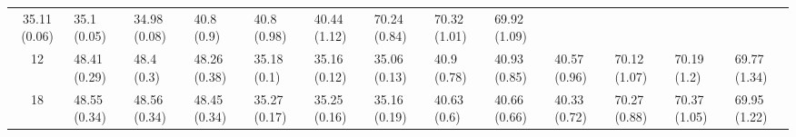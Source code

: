 \documentclass[letterpaper]{article} %
\newcommand{\hh}[1]{\textcolor{green}{#1}}
\begin{document}
{\begin{table}[]
\begin{center}
{\begin{tabular}{c|llllll|llllll}
  35.11 (0.06) &
  35.1 (0.05) &
  34.98 (0.08) &
  40.8 (0.9) &
  40.8 (0.98) &
  \multicolumn{1}{l|}{40.44 (1.12)} &
  70.24 (0.84) &
  70.32 (1.01) &
  69.92 (1.09) \\
12 &
  48.41 (0.29) &
  48.4 (0.3) &
  \multicolumn{1}{l|}{48.26 (0.38)} &
  35.18 (0.1) &
  35.16 (0.12) &
  35.06 (0.13) &
  40.9 (0.78) &
  40.93 (0.85) &
  \multicolumn{1}{l|}{40.57 (0.96)} &
  70.12 (1.07) &
  70.19 (1.2) &
  69.77 (1.34) \\
18 &
  48.55 (0.34) &
  48.56 (0.34) &
  \multicolumn{1}{l|}{48.45 (0.34)} &
  35.27 (0.17) &
  35.25 (0.16) &
  35.16 (0.19) &
  40.63 (0.6) &
  40.66 (0.66) &
  \multicolumn{1}{l|}{40.33 (0.72)} &
  70.27 (0.88) &
  70.37 (1.05) &
  69.95 (1.22)
\end{tabular}
}
\label{table:ensemble}
\end{center}
\label{table:GBML_CROSS}
\end{table}

}
\end{document}
